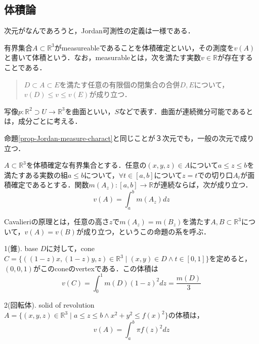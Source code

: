 \documentclass[uplatex, dvipdfmx]{jsreport}
\begin{document}
\subsection{体積論}
次元がなんであろうと，Jordan可測性の定義は一様である．

\begin{definition}
    有界集合$A\subset \mathbb{R}^3$がmeasureableであることを体積確定といい，その測度を$v(A)$と書いて体積という．なお，measurableとは，次を満たす実数$v\in\mathbb{R}$が存在することである．
    \begin{quote}
        $D\subset A\subset E$を満たす任意の有限個の閉集合の合併$D,E$について，$v(D)\le v\le v(E)$が成り立つ．
    \end{quote}
\end{definition}

\begin{definition}
    写像$p:\mathbb{R}^2\supset U\to\mathbb{R}^3$を曲面といい，$S$などで表す．曲面が連続微分可能であるとは，成分ごとに考える．
\end{definition}

\begin{proposition}
    命題\ref{prop-Jordan-measure-charact}と同じことが３次元でも，一般の次元で成り立つ．
\end{proposition}

\begin{proposition}[Cavalieriの原理]
    $A\subset\mathbb{R}^3$を体積確定な有界集合とする．任意の$(x,y,z)\in A$について$a\le z\le b$を満たすある実数の組$a\le b$について，$\forall t\in [a,b]$について$z=t$での切り口$A_t$が面積確定であるとする．関数$m(A_z):[a,b]\to\mathbb{R}$が連続ならば，次が成り立つ．
    \[ v(A)=\int^b_am(A_z)dz \]
\end{proposition}
\begin{remark*}
    Cavalieriの原理とは，任意の高さ$z$で$m(A_z)=m(B_z)$を満たす$A,B\subset\mathbb{R}^3$について，$v(A)=v(B)$が成り立つ，というこの命題の系を呼ぶ．
\end{remark*}

\begin{example}
    1(錐). base $D$に対して，cone $C=\{((1-z)x,(1-z)y,z)\in\mathbb{R}^3\mid (x,y)\in D\land t\in [0,1]\}$を定めると，$(0,0,1)$がこのconeのvertexである．この体積は
    \[ v(C)=\int^1_0m(D)(1-z)^2dz = \frac{m(D)}{3} \]

    2(回転体). solid of revolution $A=\{(x,y,z)\in\mathbb{R}^3\mid a\le z\le b\land x^2+y^2\le f(x)^2\}$の体積は，
    \[ v(A)=\int^b_a\pi f(z)^2dz \]
\end{example}
\end{document}
